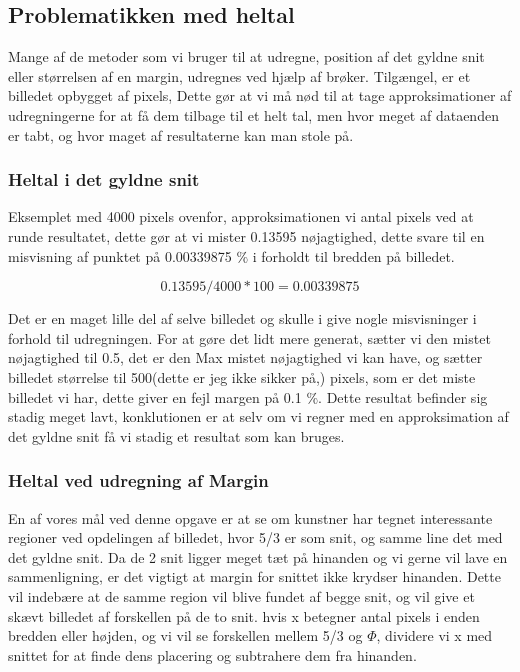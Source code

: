 \subsection*{Problematikken med heltal}
Mange af de metoder som vi bruger til at udregne, position af det gyldne
snit eller størrelsen af en margin, udregnes ved hjælp af brøker.
Tilgængel, er et billedet opbygget af pixels, Dette gør at vi må nød
til at tage approksimationer af udregningerne for at få dem tilbage til et
helt tal, men hvor meget af dataenden er tabt, og hvor maget af
resultaterne kan man stole på.

\subsubsection*{Heltal i det gyldne snit}
Eksemplet med 4000 pixels ovenfor, approksimationen vi antal pixels ved at
runde resultatet, dette gør at vi mister 0.13595 nøjagtighed, dette svare
til en misvisning af punktet på 0.00339875 $\%$ i forholdt til bredden på
billedet. 

\begin{equation}
	0.13595/4000*100 = 0.00339875
\end{equation}

Det er en maget lille del af selve billedet og skulle i give nogle
misvisninger i forhold til udregningen. For at gøre det lidt mere
generat, sætter vi den mistet nøjagtighed til 0.5, det er den Max mistet
nøjagtighed vi kan have, og sætter billedet størrelse til 500(dette er
jeg ikke sikker på,) pixels, som er det miste billedet vi har, dette
giver en fejl margen på 0.1 $\%$. Dette resultat befinder sig stadig
meget lavt, konklutionen er at selv om vi regner med en
approksimation af det gyldne snit få vi stadig et resultat som kan bruges.

\subsubsection{Heltal ved udregning af Margin}
En af vores mål ved denne opgave er at se om kunstner har tegnet
interessante regioner ved opdelingen af billedet, hvor 5/3 er som snit, og
samme line det med det gyldne snit. Da de 2 snit ligger meget tæt på
hinanden og vi gerne vil lave en sammenligning, er det vigtigt at margin
for snittet ikke krydser hinanden. Dette vil indebære at de samme
region vil blive fundet af begge snit, og vil give et skævt billedet
af forskellen på de to snit.
hvis x betegner antal pixels i enden bredden eller højden, og vi vil se
forskellen mellem 5/3 og $\Phi$, dividere vi x med snittet for at finde
dens placering og subtrahere dem fra hinanden.

